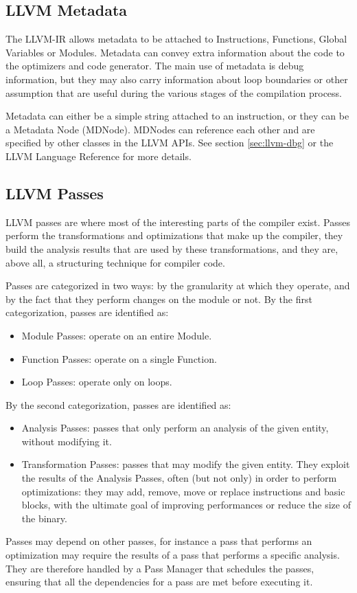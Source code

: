 \subsection{LLVM Metadata}
The LLVM-IR allows metadata to be attached to Instructions, Functions, Global Variables or  Modules. Metadata can convey extra information about the code to the optimizers and code generator.
The main use of metadata is debug information, but they may also carry information about loop boundaries or other assumption that are useful during the various stages of the compilation process. \par
Metadata can either be a simple string attached to an instruction, or they can be a Metadata Node (MDNode). MDNodes can reference each other and are specified by other classes in the LLVM APIs. See section \ref{sec:llvm-dbg} or the LLVM Language Reference \cite{llvm-langref} for more details.

\subsection{LLVM Passes\label{sec:llvm-passes}}
LLVM passes are where most of the interesting parts of the compiler exist. Passes perform the transformations and optimizations that make up the compiler, they build the analysis results that are used by these transformations, and they are, above all, a structuring technique for compiler code. \par
Passes are categorized in two ways: by the granularity at which they operate, and by the fact that they perform changes on the module or not. \newline
By the first categorization, passes are identified as:
\begin{itemize}
\item Module Passes: operate on an entire Module.
\item Function Passes: operate on a single Function.
\item Loop Passes: operate only on loops.
\end{itemize}
By the second categorization, passes are identified as:
\begin{itemize}
\item Analysis Passes: passes that only perform an analysis of the given entity, without modifying it. 
\item Transformation Passes: passes that may modify the given entity. They exploit the results of the Analysis Passes, often (but not only) in order to perform optimizations: they may add, remove, move or replace instructions and basic blocks, with the ultimate goal of improving performances or reduce the size of the binary.
\end{itemize} \par 
Passes may depend on other passes, for instance a pass that performs an optimization may require the results of a pass that performs a specific analysis.
They are therefore handled by a Pass Manager that schedules the passes, ensuring that all the dependencies for a pass are met before executing it. 

